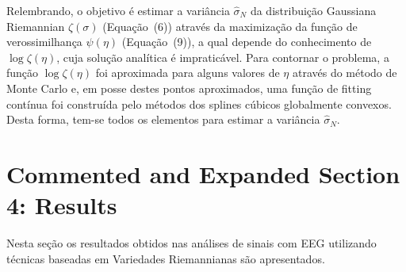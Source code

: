 \documentclass[a4paper,titlepage]{article}
\begin{document}
\begin{center}
  \vspace{1em}
  \vspace{1em}
\end{center}

Relembrando, o objetivo é estimar a variância $\hat{\sigma}_N$ da distribuição
Gaussiana Riemannian $\zeta(\sigma)$ (Equação~(6)) através da maximização da
função de verossimilhança $\psi(\eta)$ (Equação~(9)), a qual depende do
conhecimento de $\log \zeta(\eta)$, cuja solução analítica é impraticável.
Para contornar o problema, a função $\log \zeta(\eta)$ foi aproximada para
alguns valores de $\eta$ através do método de Monte Carlo e, em posse destes
pontos aproximados, uma função de fitting contínua foi construída pelo métodos
dos splines cúbicos globalmente convexos. Desta forma, tem-se todos os
elementos para estimar a variância $\hat{\sigma}_N$.

\section{Commented and Expanded Section 4: Results}
Nesta seção os resultados obtidos nas análises de sinais com EEG utilizando
técnicas baseadas em Variedades Riemannianas são apresentados.

\begin{center}
  \vspace{1em}
  \vspace{1em}
\end{center}
\end{document}
